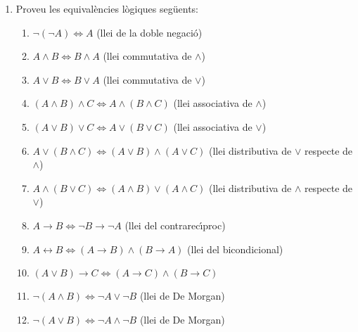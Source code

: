 \begin{enumerate}
\item Proveu les equival\`{e}ncies l\`{o}giques seg\"{u}ents:

\begin{enumerate}
\item $\lnot\left(  \lnot A\right)  \Longleftrightarrow A$ (llei de la doble negaci\'{o})

\item $A\wedge B\Longleftrightarrow B\wedge A$ (llei commutativa de $\wedge$)

\item $A\vee B\Longleftrightarrow B\vee A$ (llei commutativa de $\vee$)

\item $\left(  A\wedge B\right)  \wedge C\Longleftrightarrow A\wedge\left(
B\wedge C\right)  $ (llei associativa de $\wedge$)

\item $\left(  A\vee B\right)  \vee C\Longleftrightarrow A\vee\left(  B\vee
C\right)  $ (llei associativa de $\vee$)

\item $A\vee\left(  B\wedge C\right)  \Longleftrightarrow\left(  A\vee
B\right)  \wedge\left(  A\vee C\right)  $ (llei distributiva de $\vee$
respecte de $\wedge$)

\item $A\wedge\left(  B\vee C\right)  \Longleftrightarrow\left(  A\wedge
B\right)  \vee\left(  A\wedge C\right)  $ (llei distributiva de $\wedge$
respecte de $\vee$)

\item $A\longrightarrow B\Longleftrightarrow\lnot B\longrightarrow\lnot A$
(llei del contrarec\'{\i}proc)

\item $A\longleftrightarrow B\Longleftrightarrow\left(  A\longrightarrow
B\right)  \wedge\left(  B\longrightarrow A\right)  $ (llei del bicondicional)

\item $\left(  A\vee B\right)  \longrightarrow C\Longleftrightarrow\left(
A\longrightarrow C\right)  \wedge\left(  B\longrightarrow C\right)  $

\item $\lnot(A\wedge B)\Longleftrightarrow\lnot A\vee\lnot B$ (llei de De Morgan)

\item $\lnot(A\vee B)\Longleftrightarrow\lnot A\wedge\lnot B$ (llei de De Morgan)
\end{enumerate}


\end{enumerate}
